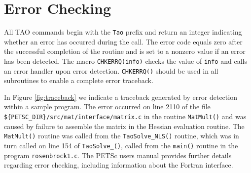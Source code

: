 \begin{comment}
  Figure~\ref{fig:exrun} illustrates compiling and running a TAO
  program using MPICH.  Note that different sites may have slightly
  different library and compiler names.
\end{comment}

\begin{comment}
  Users who are experiencing difficulties linking TAO programs should
  refer to the troubleshooting guide via the TAO home page {\tt
    http://www.mcs.anl.gov/tao}. or the source code given by the file
  \texttt{{TAO\_DIR}/docs/troubleshooting.html}.
\end{comment}

\begin{comment}
\begin{figure}[htb]
{\footnotesize
\begin{verbatim}
[ember] ex2 -tao_method tao_nls -tao_monitor
iter = 0, Function value: -0.330579, Residual: 0.728961
iter = 1, Function value: -0.427745, Residual: 3.64242e-07
iter = 2, Function value: -0.427745, Residual: 2.03244e-12

[ember] mpirun -np 2 ex2 -tao_method tao_nls -tao_monitor
iter = 0, Function value: -0.330579, Residual: 0.728961
iter = 1, Function value: -0.427745, Residual: 3.63647e-07
iter = 2, Function value: -0.427745, Residual: 2.18415e-12

\end{verbatim}
}
\nobreak
\caption{Running a TAO Program}
\label{fig:exrun}
\end{figure}
  
\end{comment}


\section{Error Checking}

All TAO commands begin with the \texttt{Tao} prefix and return an
integer indicating whether an error has occurred during the call.  The
error code equals zero after the successful completion of the routine
and is set to a nonzero value if an error has been detected.  The
macro \texttt{CHKERRQ(info)} checks the value of \texttt{info} and calls an
error handler upon error detection.  \texttt{CHKERRQ()} should be used in
all subroutines to enable a complete error traceback.

In Figure \ref{fig:traceback} we indicate a traceback generated by
error detection within a sample program. The error occurred on line
2110 of the file \texttt{\$\{PETSC\_DIR\}/src/mat/interface/matrix.c} in the
routine \texttt{MatMult()} and was caused by failure to assemble the 
matrix in the Hessian evaluation routine.
The \texttt{MatMult()} routine was called from
the \texttt{TaoSolve\_NLS()} routine, which was in turn called on line 
154 of \texttt{TaoSolve\_()}, called from the \texttt{main()} routine 
in the program \texttt{rosenbrock1.c}.  The PETSc users
manual provides further details regarding error checking, including
information about the Fortran interface.


